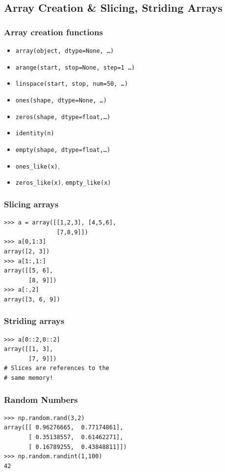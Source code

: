 \documentclass[14pt,compress]{beamer}
\newcounter{time}
\newcommand{\inctime}[1]{\addtocounter{time}{#1}{\tiny \thetime\ m}}
\newcommand{\typ}[1]{\texttt{#1}}
\begin{document}
\subsection{Array Creation \& Slicing, Striding Arrays}
\begin{frame}[fragile]
  \frametitle{Array creation functions}
  \begin{itemize}
  \item \typ{array(object, dtype=None, \ldots)}
  \item \typ{arange(start, stop=None, step=1 \ldots)}
  \item \typ{linspace(start, stop, num=50, \ldots)}
  \item \typ{ones(shape, dtype=None, \ldots)}
  \item \typ{zeros(shape, dtype=float,\ldots)}
  \item \typ{identity(n)}
  \item \typ{empty(shape, dtype=float,\ldots)}
  \item \typ{ones\_like(x)}, 
  \item \typ{zeros\_like(x)}, \typ{empty\_like(x)}
  \end{itemize}
\end{frame}

\begin{frame}[fragile]
  \frametitle{Slicing arrays}
\begin{lstlisting}
>>> a = array([[1,2,3], [4,5,6], 
               [7,8,9]])
>>> a[0,1:3]
array([2, 3])
>>> a[1:,1:]
array([[5, 6],
       [8, 9]])
>>> a[:,2]
array([3, 6, 9])
\end{lstlisting}
\end{frame}

\begin{frame}[fragile]
  \frametitle{Striding arrays}
\begin{lstlisting}
>>> a[0::2,0::2]
array([[1, 3],
       [7, 9]])
# Slices are references to the 
# same memory!
\end{lstlisting}
\end{frame}

\begin{frame}[fragile]
\frametitle{Random Numbers}
\begin{lstlisting}
>>> np.random.rand(3,2)
array([[ 0.96276665,  0.77174861],
       [ 0.35138557,  0.61462271],
       [ 0.16789255,  0.43848811]])
>>> np.random.randint(1,100)
42
\end{lstlisting}
\inctime{15}
\end{frame}
\end{document}
